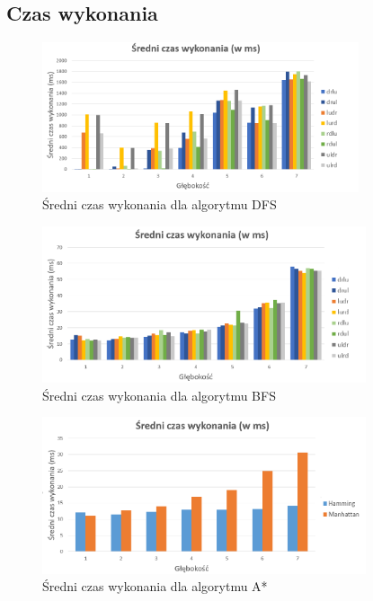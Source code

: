 \documentclass{classrep}
\begin{document}
\subsection{Czas wykonania}
\begin{figure}[h!]
    \centering
    \includegraphics[width=0.83\textwidth]{czasdfs.png}
    \caption{Średni czas wykonania dla algorytmu DFS}
	\label{czasDFS}
\end{figure}
\begin{figure}[h!]
    \centering
    \includegraphics[width=0.85\textwidth]{czasbfs.png}
    \caption{Średni czas wykonania dla algorytmu BFS}
	\label{czasBFS}
\end{figure}
\begin{figure}[h!]
    \centering
    \includegraphics[width=0.85\textwidth]{czasastr.png}
    \caption{Średni czas wykonania dla algorytmu A*}
	\label{czasASTR}
\end{figure}
\end{document}
